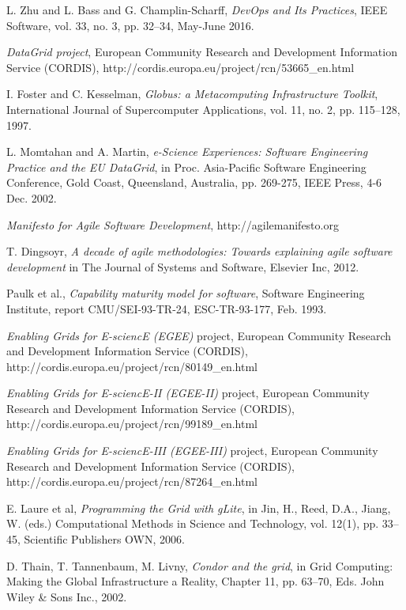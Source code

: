 \documentclass[journal]{IEEEtran}
\begin{document}
\begin{thebibliography}{1}

L. Zhu and L. Bass and G. Champlin-Scharff, \emph{DevOps and Its Practices},
IEEE Software, vol. 33, no. 3, pp. 32--34, May-June 2016.


\emph{DataGrid project}, European Community Research and Development
Information Service (CORDIS),
http://cordis.europa.eu/project/rcn/53665\_en.html

I. Foster and C. Kesselman, \emph{Globus: a Metacomputing Infrastructure
Toolkit}, International Journal of Supercomputer Applications, vol. 11, no. 2,
pp. 115–128, 1997.

L. Momtahan and A. Martin, \emph{e-Science Experiences: Software Engineering
Practice and the EU DataGrid}, in Proc. Asia-Pacific Software Engineering
Conference, Gold Coast, Queensland, Australia, pp. 269-275, IEEE Press,
4-6 Dec. 2002.

\emph{Manifesto for Agile Software Development}, http://agilemanifesto.org

T. Dingsoyr, \emph{A decade of agile methodologies: Towards explaining agile
software development} in The Journal of Systems and Software, Elsevier Inc,
2012.

Paulk et al., \emph{Capability maturity model for software}, Software
Engineering Institute, report CMU/SEI-93-TR-24, ESC-TR-93-177, Feb. 1993.

\emph{Enabling Grids for E-sciencE (EGEE)} project, European Community
Research and Development Information Service (CORDIS),
http://cordis.europa.eu/project/rcn/80149\_en.html

\emph{Enabling Grids for E-sciencE-II (EGEE-II)} project, European Community
Research and Development Information Service (CORDIS),
http://cordis.europa.eu/project/rcn/99189\_en.html

\emph{Enabling Grids for E-sciencE-III (EGEE-III)} project, European Community
Research and Development Information Service (CORDIS),
http://cordis.europa.eu/project/rcn/87264\_en.html

E. Laure et al, \emph{Programming the Grid with gLite}, in Jin, H., Reed, D.A.,
Jiang, W. (eds.) Computational Methods in Science and Technology, vol. 12(1),
pp. 33–45, Scientific Publishers OWN, 2006.

D. Thain, T. Tannenbaum, M. Livny, \emph{Condor and the grid}, in Grid
Computing: Making the Global Infrastructure a Reality, Chapter 11, pp. 63–70,
Eds. John Wiley \& Sons Inc., 2002.


\end{thebibliography}
\end{document}
